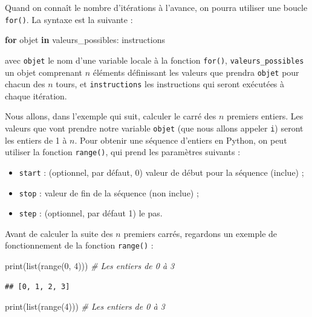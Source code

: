 \documentclass[12pt,]{book}
\newenvironment{Shaded}{\begin{snugshade}}{\end{snugshade}}
\newcommand{\KeywordTok}[1]{\textcolor[rgb]{0.13,0.29,0.53}{\textbf{#1}}}
\newcommand{\DecValTok}[1]{\textcolor[rgb]{0.00,0.00,0.81}{#1}}
\newcommand{\CommentTok}[1]{\textcolor[rgb]{0.56,0.35,0.01}{\textit{#1}}}
\newcommand{\ControlFlowTok}[1]{\textcolor[rgb]{0.13,0.29,0.53}{\textbf{#1}}}
\newcommand{\BuiltInTok}[1]{#1}
\newcommand{\NormalTok}[1]{#1}
\providecommand{\tightlist}{%
  \setlength{\itemsep}{0pt}\setlength{\parskip}{0pt}}
\numberwithin{equation}{section}
\numberwithin{countremarque}{section}
\begin{document}
Quand on connaît le nombre d'itérations à l'avance, on pourra utiliser
une boucle \texttt{for()}. La syntaxe est la suivante :

\begin{Shaded}
\begin{Highlighting}[]
\ControlFlowTok{for}\NormalTok{ objet }\KeywordTok{in}\NormalTok{ valeurs_possibles:}
\NormalTok{  instructions}
\end{Highlighting}
\end{Shaded}

avec \texttt{objet} le nom d'une variable locale à la fonction
\texttt{for()}, \texttt{valeurs\_possibles} un objet comprenant \(n\)
éléments définissant les valeurs que prendra \texttt{objet} pour chacun
des \(n\) tours, et \texttt{instructions} les instructions qui seront
exécutées à chaque itération.

Nous allons, dans l'exemple qui suit, calculer le carré des \(n\)
premiers entiers. Les valeurs que vont prendre notre variable
\texttt{objet} (que nous allons appeler \texttt{i}) seront les entiers
de 1 à \(n\). Pour obtenir une séquence d'entiers en Python, on peut
utiliser la fonction \texttt{range()}, qui prend les paramètres suivants
:

\begin{itemize}
\tightlist
\item
  \texttt{start} : (optionnel, par défaut, 0) valeur de début pour la
  séquence (inclue) ;
\item
  \texttt{stop} : valeur de fin de la séquence (non inclue) ;
\item
  \texttt{step} : (optionnel, par défaut 1) le pas.
\end{itemize}

Avant de calculer la suite des \(n\) premiers carrés, regardons un
exemple de fonctionnement de la fonction \texttt{range()} :

\begin{Shaded}
\begin{Highlighting}[]
\BuiltInTok{print}\NormalTok{(}\BuiltInTok{list}\NormalTok{(}\BuiltInTok{range}\NormalTok{(}\DecValTok{0}\NormalTok{, }\DecValTok{4}\NormalTok{))) }\CommentTok{# Les entiers de 0 à 3}
\end{Highlighting}
\end{Shaded}

\begin{lstlisting}
## [0, 1, 2, 3]
\end{lstlisting}

\begin{Shaded}
\begin{Highlighting}[]
\BuiltInTok{print}\NormalTok{(}\BuiltInTok{list}\NormalTok{(}\BuiltInTok{range}\NormalTok{(}\DecValTok{4}\NormalTok{))) }\CommentTok{# Les entiers de 0 à 3}
\end{Highlighting}
\end{Shaded}
\end{document}
